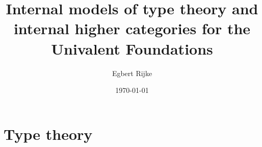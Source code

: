 \documentclass{article}
\title{Internal models of type theory and internal higher categories for the
Univalent Foundations}
\author{Egbert Rijke}
\date{\today}
\begin{document}
\maketitle

\begin{comment}
\begin{abstract}
A project is proposed where we investigate notions of internal models of type
theory and internal higher categories. We take the point of view that an
internal model is an internal higher category with extra structure interpreting
the type constructors. We propose to (1) explore possible definitions of both
notions, (2) find a zoo of examples and (3) find extensions of the underlying
theory and models thereof to include higher inductive types.
\end{abstract}
\end{comment}

\tableofcontents

\begin{comment}
\part{Introduction}
The project proposal is described in \autoref{stage1} and \autoref{stage2}. In
the appendices we give elaborations on the topics discussed in the proposal itself.
By including these we intend to clarify the proposal and present some of the 
(unfinished) work that is already done.





%
\end{comment}



\part{Type theory}
\end{document}
